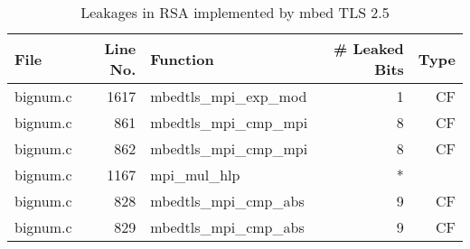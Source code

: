 \begin{table}[h!]
\centering\tiny\scriptsize
\caption{Leakages in RSA implemented by mbed TLS 2.5}\label{tab:RSAmbed TLS2.5}
\begin{tabular}{lrlrr}
\hline
\textbf{File} & \textbf{Line No.} & \textbf{Function} & \textbf{\# Leaked Bits} & \textbf{Type} \\\hline
bignum.c& 1617&mbedtls\_mpi\_exp\_mod&1 &CF\\
bignum.c& 861&mbedtls\_mpi\_cmp\_mpi&8 &CF\\
bignum.c& 862&mbedtls\_mpi\_cmp\_mpi&8 &CF\\
bignum.c& 1167&mpi\_mul\_hlp&*&\\
bignum.c& 828&mbedtls\_mpi\_cmp\_abs&9 &CF\\
bignum.c& 829&mbedtls\_mpi\_cmp\_abs&9 &CF\\
\hline
\end{tabular}
\renewcommand{\baselinestretch}{1.0}\selectfont
\end{table}
